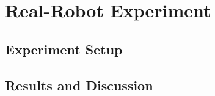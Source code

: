 \chapter{Real-Robot Experiment}\label{ch:real_robot_experiment}

\section{Experiment Setup}

\section{Results and Discussion}

